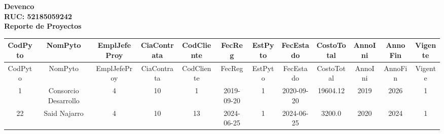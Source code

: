 \documentclass[a4paper, landscape]{article}
\begin{document}
\begin{center}
\vspace{0.5cm}
\textbf{\Huge Devenco}\\ %
\vspace{0.2cm}
\textbf{\Large RUC: 52185059242}\\ %
\vspace{1cm}
\textbf{\Large Reporte de Proyectos}
\end{center}
\vspace{1cm}
\begin{center}
\begin{longtable}{|c|c|c|c|c|c|c|c|c|c|c|c|}
\hline
CodPyto & NomPyto & EmplJefeProy & CiaContrata & CodCliente & FecReg & EstPyto & FecEstado & CostoTotal & AnnoIni & AnnoFin & Vigente \\
\hline
\endfirsthead
\hline
CodPyto & NomPyto & EmplJefeProy & CiaContrata & CodCliente & FecReg & EstPyto & FecEstado & CostoTotal & AnnoIni & AnnoFin & Vigente \\
\hline
\endhead
1 & Consorcio Desarrollo & 4 & 10 & 1 & 2019-09-20 & 1 & 2020-09-20 & 19604.12 & 2019 & 2026 & 1 \\
22 & Said Najarro & 4 & 10 & 13 & 2024-06-25 & 1 & 2024-06-25 & 3200.0 & 2020 & 2024 & 1 \\
\hline
\end{longtable}
\end{center}
\end{document}
